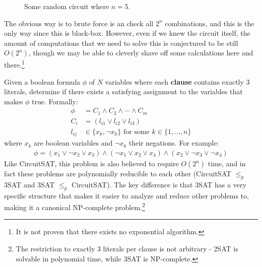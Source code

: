\begin{definition}[CircuitSAT]
\begin{figure}[H]
      \caption{Some random circuit where $n = 5$.} 
      \label{fig:random_circuit}
    \end{figure}

    The obvious way is to brute force is an check all $2^n$ combinations, and this is the only way since this is black-box. However, even if we knew the circuit itself, the amount of computations that we need to solve this is conjectured to be still $O(2^n)$, though we may be able to cleverly shave off some calculations here and there.\footnote{It is not proven that there exists no exponential algorithm.}
  \end{definition}

  \begin{definition}[3SAT]
    Given a boolean formula $\phi$ of $N$ variables where each \textbf{clause} contains exactly 3 literals, determine if there exists a satisfying assignment to the variables that makes $\phi$ true. Formally:
    \begin{align*}
      \phi &= C_1 \land C_2 \land \cdots \land C_m \\
      C_i &= (l_{i1} \lor l_{i2} \lor l_{i3}) \\
      l_{ij} &\in \{x_k, \neg x_k\} \text{ for some } k \in \{1,\ldots,n\}
    \end{align*}
    where $x_k$ are boolean variables and $\neg x_k$ their negations. For example:
    \begin{align*}
      \phi = (x_1 \lor \neg x_2 \lor x_3) \land (\neg x_1 \lor x_2 \lor x_4) \land (x_2 \lor \neg x_3 \lor \neg x_4)
    \end{align*}
    Like CircuitSAT, this problem is also believed to require $O(2^n)$ time, and in fact these problems are polynomially reducible to each other (CircuitSAT $\leq_p$ 3SAT and 3SAT $\leq_p$ CircuitSAT). The key difference is that 3SAT has a very specific structure that makes it easier to analyze and reduce other problems to, making it a canonical NP-complete problem.\footnote{The restriction to exactly 3 literals per clause is not arbitrary - 2SAT is solvable in polynomial time, while 3SAT is NP-complete.}
  \end{definition}

